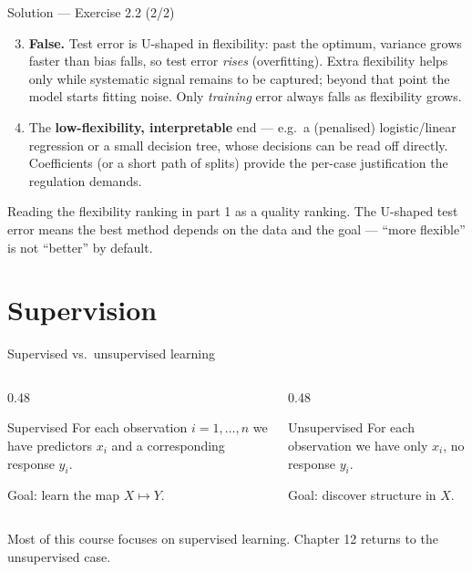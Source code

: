 \documentclass[aspectratio=169,11pt]{beamer}
\begin{document}
\begin{frame}{Solution --- Exercise 2.2 (2/2)}
\begin{solutionbox}
\begin{enumerate}\setcounter{enumi}{2}
  \item \textbf{False.} Test error is U-shaped in flexibility: past
        the optimum, variance grows faster than bias falls, so test
        error \emph{rises} (overfitting). Extra flexibility helps only
        while systematic signal remains to be captured; beyond that
        point the model starts fitting noise. Only \emph{training}
        error always falls as flexibility grows.
  \item The \textbf{low-flexibility, interpretable} end --- e.g.\ a
        (penalised) logistic/linear regression or a small decision
        tree, whose decisions can be read off directly. Coefficients
        (or a short path of splits) provide the per-case justification
        the regulation demands.
\end{enumerate}
\end{solutionbox}
\begin{mistake}
Reading the flexibility ranking in part 1 as
a quality ranking. The U-shaped test error means the best method
depends on the data and the goal --- ``more flexible'' is not
``better'' by default.
\end{mistake}
\end{frame}


\section{Supervision}

\begin{frame}{Supervised vs.\ unsupervised learning}
  \begin{columns}[T]
    \begin{column}{0.48\textwidth}
      \begin{block}{Supervised}
        For each observation $i = 1, \ldots, n$ we have predictors
        $x_i$ and a corresponding response $y_i$.
      \end{block}
      Goal: learn the map $X \mapsto Y$.
    \end{column}
    \begin{column}{0.48\textwidth}
      \begin{block}{Unsupervised}
        For each observation we have only $x_i$, no response $y_i$.
      \end{block}
      Goal: discover structure in $X$.
    \end{column}
  \end{columns}
  \begin{takeaway}
    Most of this course focuses on supervised learning. Chapter 12
    returns to the unsupervised case.
  \end{takeaway}
\end{frame}
\end{document}
